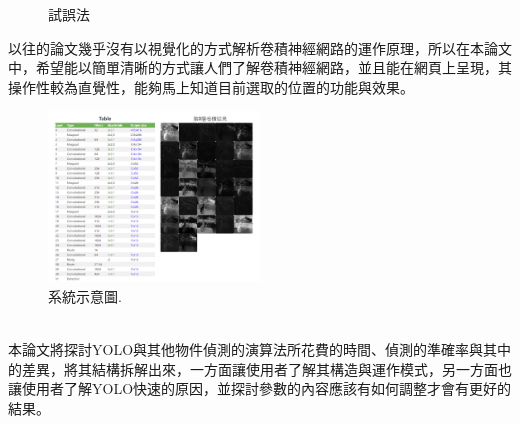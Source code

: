 \begin{figure}[H]
\centering
{}
\caption{試誤法}
\label{Fig.main}
\end{figure}
以往的論文幾乎沒有以視覺化的方式解析卷積神經網路的運作原理，所以在本論文中，希望能以簡單清晰的方式讓人們了解卷積神經網路，並且能在網頁上呈現，其操作性較為直覺性，能夠馬上知道目前選取的位置的功能與效果。
\begin{figure}[htpb!]
  \centering
    \includegraphics[width=0.5\textwidth]{fig/system1.png}
    \caption{\label{fig:系統1}系統示意圖.}
\end{figure}
\\本論文將探討YOLO與其他物件偵測的演算法所花費的時間、偵測的準確率與其中的差異，將其結構拆解出來，一方面讓使用者了解其構造與運作模式，另一方面也讓使用者了解YOLO快速的原因，並探討參數的內容應該有如何調整才會有更好的結果。\\
